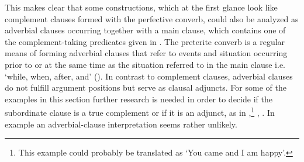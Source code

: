 This makes clear that some constructions, which at the first glance look like complement clauses formed with the perfective converb, could also be analyzed as adverbial clauses occurring together with a main clause, which contains one of the complement-taking predicates given in . The preterite converb is a regular means of forming adverbial clauses that refer to events and situation occurring prior to or at the same time as the situation referred to in the main clause i.e. `while, when, after, and' (). In contrast to complement clauses, adverbial clauses do not fulfill argument positions but serve as clausal adjuncts. For some of the examples in this section further research is needed in order to decide if the subordinate clause is a true complement or if it is an adjunct, as in ,\footnote{This example could probably be translated as `You came and I am happy'.} , . In example  an adverbial-clause interpretation seems rather unlikely.

